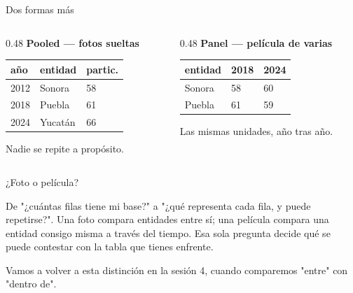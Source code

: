\begin{frame}{Dos formas más}
  \vspace{0.2em}
  \small
  \begin{columns}[T]
    \begin{column}{0.48\textwidth}
      \textbf{Pooled — fotos sueltas}
      \begin{tabular}{@{}lll@{}}
        \toprule
        año & entidad & partic. \\
        \midrule
        2012 & Sonora & 58 \\
        2018 & Puebla & 61 \\
        2024 & Yucatán & 66 \\
        \bottomrule
      \end{tabular}
      \vspace{0.4em}

      {\footnotesize\color{grisTenue}Nadie se repite a propósito.}
    \end{column}
    \begin{column}{0.48\textwidth}
      \textbf{Panel — película de varias}
      \begin{tabular}{@{}lll@{}}
        \toprule
        entidad & 2018 & 2024 \\
        \midrule
        Sonora & 58 & 60 \\
        Puebla & 61 & 59 \\
        \bottomrule
      \end{tabular}
      \vspace{0.4em}

      {\footnotesize\color{grisTenue}Las mismas unidades, año tras año.}
    \end{column}
  \end{columns}
\end{frame}

\begin{frame}{¿Foto o película?}
  \vspace{0.5em}
  \begin{saltobox}
    De "¿cuántas filas tiene mi base?" a "¿qué representa cada fila, y
    puede repetirse?". Una foto compara entidades entre sí; una película
    compara una entidad consigo misma a través del tiempo. Esa sola
    pregunta decide qué se puede contestar con la tabla que tienes
    enfrente.
  \end{saltobox}

  \vspace{1.0em}
  {\small\color{grisTenue}Vamos a volver a esta distinción en la sesión 4,
  cuando comparemos "entre" con "dentro de".}
\end{frame}

